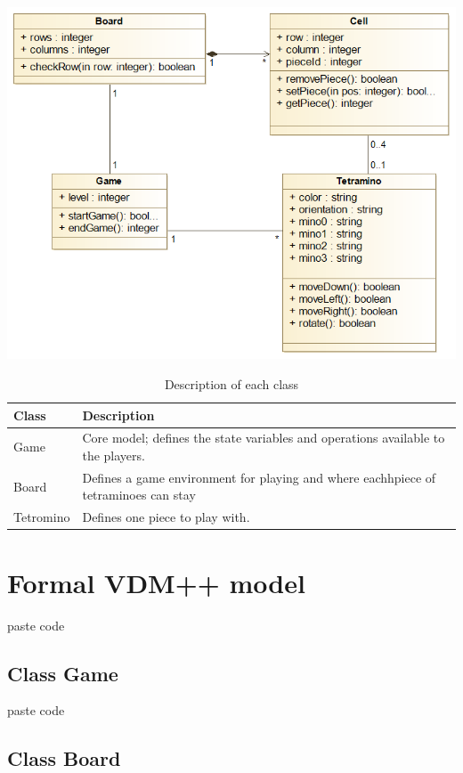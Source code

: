 \documentclass[a4paper]{article}
\begin{document}
\begin{center}
	\includegraphics[scale=0.4]{resources/img/uml}
	\label{uml}
\end{center}

\begin{table}[!h]
	\centering
	\label{description-classes}
	\begin{tabular}{|l|p{10cm}|}
	\hline
	\textbf{Class} & \textbf{Description}	\\	\hline
	Game		   &	Core model; defines the state variables and operations available to the players.	\\	\hline
	Board		   &	Defines a game environment for playing and where eachhpiece of tetraminoes can stay \\	\hline
	Tetromino	   &	Defines one piece to play with.	\\	\hline
	\end{tabular}
	\caption{Description of each class}
\end{table}

\section{Formal VDM++ model}

paste code

\subsection{Class Game}

paste code

\subsection{Class Board}
\end{document}

